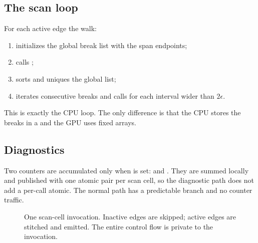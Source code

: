 \subsection{The scan loop}

For each active edge the walk:
\begin{enumerate}
\item initializes the global break list with the span endpoints;
\item calls ;
\item sorts and uniques the global list;
\item iterates consecutive breaks and calls  for each
  interval wider than $2\epsilon$.
\end{enumerate}
This is exactly the CPU loop.  The only difference is that the CPU stores
the breaks in a  and the GPU uses fixed arrays.

\subsection{Diagnostics}

Two counters are accumulated only when  is set:
 and .  They are summed locally and
published with one atomic pair per scan cell, so the diagnostic path does
not add a per-call atomic.  The normal path has a predictable branch and no
counter traffic.

\begin{figure}[htbp]
\centering
{}
\caption{One scan-cell invocation.  Inactive edges are skipped; active
edges are stitched and emitted.  The entire control flow is private to the
invocation.}
\label{fig:scanflow}
\end{figure}
